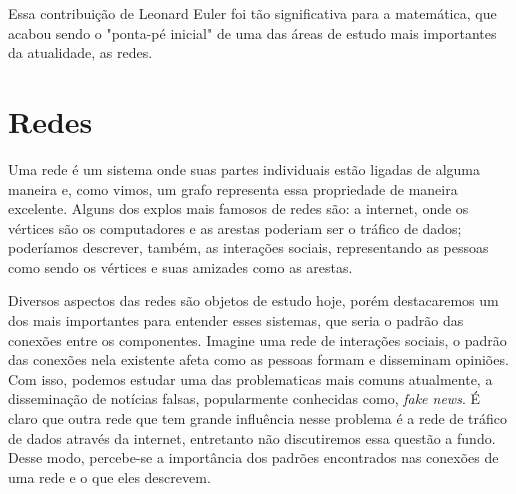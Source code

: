 \documentclass{article}
\begin{document}
Essa contribuição de Leonard Euler foi tão significativa para a matemática, que acabou sendo o "ponta-pé inicial" de uma das áreas de estudo mais importantes da atualidade, as redes.

\section{Redes}

Uma rede é um sistema onde suas partes individuais estão ligadas de alguma maneira e, como vimos, um grafo representa essa propriedade de maneira excelente. Alguns dos explos mais famosos de redes são: a internet, onde os vértices são os computadores e as arestas poderiam ser o tráfico de dados; poderíamos descrever, também, as interações sociais, representando as pessoas como sendo os vértices e suas amizades como as arestas.



Diversos aspectos das redes são objetos de estudo hoje, porém destacaremos um dos mais importantes para entender esses sistemas, que seria o padrão das conexões entre os componentes. Imagine uma rede de interações sociais, o padrão das conexões nela existente afeta como as pessoas formam e disseminam opiniões. Com isso, podemos estudar uma das problematicas mais comuns atualmente, a disseminação de notícias falsas, popularmente conhecidas como,  \textit{fake news}. É claro que outra rede que tem grande influência nesse problema é a rede de tráfico de dados através da internet, entretanto não discutiremos essa questão a fundo. Desse modo, percebe-se a importância dos padrões encontrados nas conexões de uma rede e o que eles descrevem.
 
\end{document}
